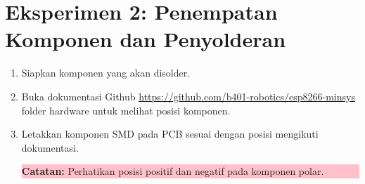 \section{Eksperimen 2: Penempatan Komponen dan Penyolderan}
\begin{enumerate}
    \item Siapkan komponen yang akan disolder.
    \item Buka dokumentasi Github \url{https://github.com/b401-robotics/esp8266-minsys} folder hardware untuk melihat posisi komponen.
    \item Letakkan komponen SMD pada PCB sesuai dengan posisi mengikuti dokumentasi.
    \begin{center}
        \colorbox{pink}{\parbox{0.8\linewidth}{\textbf{Catatan:} Perhatikan posisi positif dan negatif pada komponen polar.}}
    \end{center}
    

\end{enumerate}
